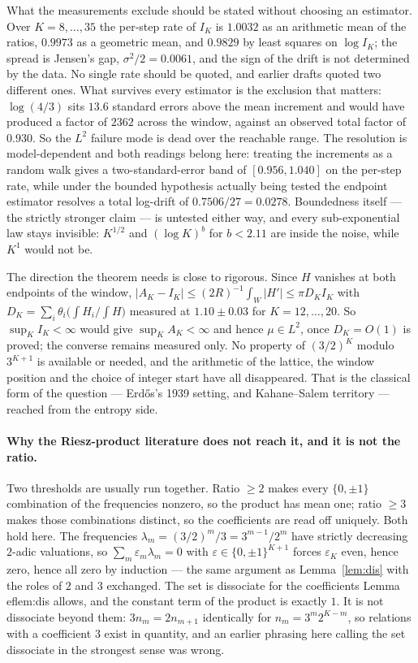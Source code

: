 \documentclass[11pt]{article}
\theoremstyle{remark}
\newcommand{\lam}{\lambda}
\newcommand{\eps}{\varepsilon}
\begin{document}
What the measurements exclude should be stated without choosing an estimator. Over $K=8,\dots,35$ the
per-step rate of $I_K$ is $1.0032$ as an arithmetic mean of the ratios, $0.9973$ as a geometric mean, and
$0.9829$ by least squares on $\log I_K$; the spread is Jensen's gap, $\sigma^2/2=0.0061$, and the sign of
the drift is not determined by the data. No single rate should be quoted, and earlier drafts quoted two
different ones. What survives every estimator is the exclusion that matters: $\log(4/3)$ sits $13.6$
standard errors above the mean increment and would have produced a factor of $2362$ across the window,
against an observed total factor of $0.930$. So the $L^2$ failure mode is dead over the reachable range.
The resolution is model-dependent and both readings belong here: treating the increments as a random walk
gives a two-standard-error band of $[0.956,1.040]$ on the per-step rate, while under the bounded
hypothesis actually being tested the endpoint estimator resolves a total log-drift of
$0.7506/27=0.0278$. Boundedness itself --- the strictly stronger claim --- is untested either way, and
every sub-exponential law stays invisible: $K^{1/2}$ and $(\log K)^b$ for $b<2.11$ are inside the noise,
while $K^1$ would not be.

The direction the theorem needs is close to rigorous. Since $H$ vanishes at both endpoints of the window,
$|A_K-I_K|\le(2R)^{-1}\int_W|H'|\le\pi D_KI_K$ with $D_K=\sum_i\theta_i\bigl(\int H_i/\int H\bigr)$
measured at $1.10\pm0.03$ for $K=12,\dots,20$. So $\sup_KI_K<\infty$ would give $\sup_KA_K<\infty$ and
hence $\mu\in L^2$, once $D_K=O(1)$ is proved; the converse remains measured only.
No property of $(3/2)^K$ modulo $3^{K+1}$ is available or needed, and the arithmetic of the lattice, the
window position and the choice of integer start have all disappeared. That is the classical form of the
question --- Erd\H{o}s's 1939 setting, and Kahane--Salem territory --- reached from the entropy side.

\paragraph{Why the Riesz-product literature does not reach it, and it is not the ratio.} Two thresholds
are usually run together. Ratio $\ge2$ makes every $\{0,\pm1\}$ combination of the frequencies nonzero,
so the product has mean one; ratio $\ge3$ makes those combinations distinct, so the coefficients are read
off uniquely. Both hold here. The frequencies $\lam_m=(3/2)^m/3=3^{m-1}/2^m$ have strictly decreasing
$2$-adic valuations, so $\sum_m\eps_m\lam_m=0$ with $\eps\in\{0,\pm1\}^{K+1}$ forces $\eps_K$ even, hence
zero, hence all zero by induction --- the same argument as Lemma~\ref{lem:dis} with the roles of $2$ and
$3$ exchanged. The set is dissociate for the coefficients Lemma~
ef{lem:dis} allows, and the constant term of the
product is exactly $1$. It is not dissociate beyond them: $3n_m=2n_{m+1}$ identically for
$n_m=3^m2^{K-m}$, so relations with a coefficient $3$ exist in quantity, and an earlier phrasing here
calling the set dissociate in the strongest sense was wrong.
\end{document}
